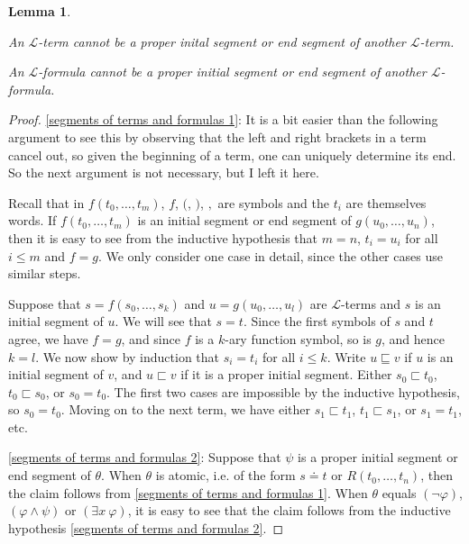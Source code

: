 \documentclass[a4paper, 11pt]{amsart}
\newtheorem{lemma}[lemma]{Lemma}
\theoremstyle{remark}
\newcommand{\cL}{\mathcal L}
\newenvironment{enumerate-(1)}{\begin{enumerate}[label={\upshape (\arabic*)}, leftmargin=2pc]}{\end{enumerate}}
\begin{document}
\begin{lemma} \ 
\label{segments of terms and formulas}
\begin{enumerate-(1)} 
\item 
\label{segments of terms and formulas 1}
An $\cL$-term cannot be a proper inital segment or end segment of another $ \cL$-term. 
\item 
\label{segments of terms and formulas 2}
An $\cL$-formula cannot be a proper initial segment or end segment of another $ \cL$-formula. 
\end{enumerate-(1)} 
\end{lemma} 
\begin{proof} 
\ref{segments of terms and formulas 1}: 
It is a bit easier than the following argument to see this by observing that the left and right brackets in a term cancel out, so given the beginning of a term, one can uniquely determine its end. 
So the next argument is not necessary, but I left it here. 

Recall that in $f(t_0,\dots,t_m)$, $f$, $($, $)$, $,$ are symbols and the $t_i$ are themselves words.  
If $f(t_0,\dots,t_m)$ is an initial segment or end segment of $g(u_0,\dots,u_n)$, then it is easy to see from the inductive hypothesis that $m=n$, $t_i=u_i$ for all $i\leq m$ and $f=g$. 
We only consider one case in detail, since the other cases use similar steps. 

Suppose that $s=f(s_0,\dots,s_k)$ and $u=g(u_0,\dots,u_l)$ are $\cL$-terms and $s$ is an initial segment of $u$. 
We will see that $s=t$. 
Since the first symbols of $s$ and $t$ agree, we have $f=g$, and since $f$ is a $k$-ary function symbol, so is $g$, and hence $k=l$. 
We now show by induction that $s_i=t_i$ for all $i\leq k$. 
Write $u\sqsubseteq v$ if $u$ is an initial segment of $v$, and $u\sqsubset v$ if it is a proper initial segment. 
Either $s_0\sqsubset t_0$, $t_0\sqsubset s_0$, or $s_0=t_0$. 
The first two cases are impossible by the inductive hypothesis, so $s_0=t_0$. 
Moving on to the next term, we have either $s_1\sqsubset t_1$, $t_1\sqsubset s_1$, or $s_1=t_1$, etc. 
 
\ref{segments of terms and formulas 2}: 
Suppose that $\psi$ is a proper initial segment or end segment of $\theta$. 
When $\theta$ is atomic, i.e. of the form $s\doteq t$ or $R(t_0,\dots,t_n)$, then the claim follows from \ref{segments of terms and formulas 1}. 
When $\theta$ equals $(\neg \varphi)$, $(\varphi \wedge \psi)$ or $(\exists x\ \varphi)$, it is easy to see that the claim follows from the inductive hypothesis \ref{segments of terms and formulas 2}. 
\end{proof} 
\end{document}
